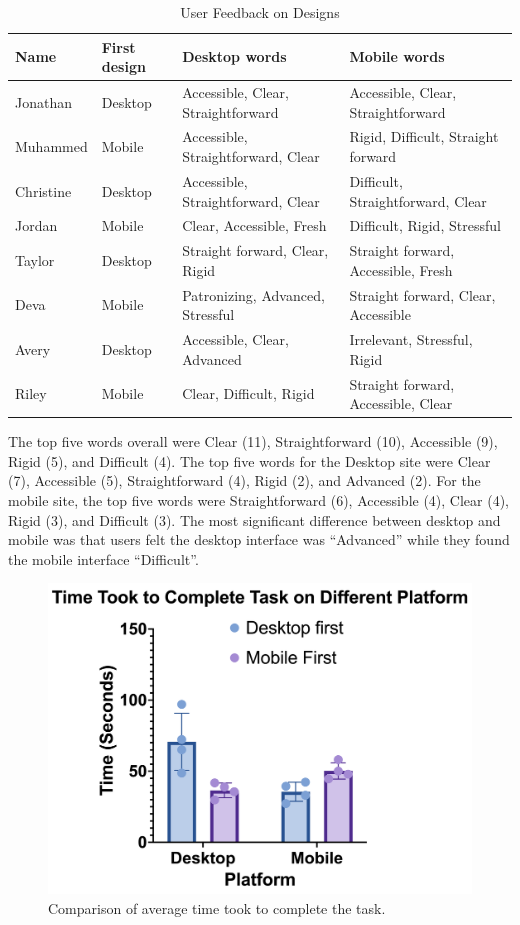 \documentclass{article}
\begin{document}
\begin{table}[h!]
\centering
\caption{User Feedback on Designs}
\begin{tabular}{ll>{\raggedright\arraybackslash}p{4.5cm}>{\raggedright\arraybackslash}p{4.5cm}}
\toprule
Name & First design & Desktop words & Mobile words \\
\midrule
Jonathan & Desktop & Accessible, Clear, Straightforward & Accessible, Clear, Straightforward \\
Muhammed & Mobile & Accessible, Straightforward, Clear & Rigid, Difficult, Straight forward \\
Christine & Desktop & Accessible, Straightforward, Clear & Difficult, Straightforward, Clear \\
Jordan & Mobile & Clear, Accessible, Fresh & Difficult, Rigid, Stressful \\
Taylor & Desktop & Straight forward, Clear, Rigid & Straight forward, Accessible, Fresh \\
Deva & Mobile & Patronizing, Advanced, Stressful & Straight forward, Clear, Accessible \\
Avery & Desktop & Accessible, Clear, Advanced & Irrelevant, Stressful, Rigid \\
Riley & Mobile & Clear, Difficult, Rigid & Straight forward, Accessible, Clear \\
\bottomrule
\end{tabular}
\end{table}

The top five words overall were Clear (11), Straightforward (10), Accessible (9), Rigid (5), and Difficult (4). The top five words for the Desktop site were Clear (7), Accessible (5), Straightforward (4), Rigid (2), and Advanced (2). For the mobile site, the top five words were Straightforward (6), Accessible (4), Clear (4), Rigid (3), and Difficult (3). The most significant difference between desktop and mobile was that users felt the desktop interface was “Advanced” while they found the mobile interface “Difficult”. 

\begin{figure}[h!]
    \centering
    \includegraphics[width=0.5\linewidth]{results.png}
    \caption{Comparison of average time took to complete the task. }
    \label{fig:1}
\end{figure}
\end{document}

